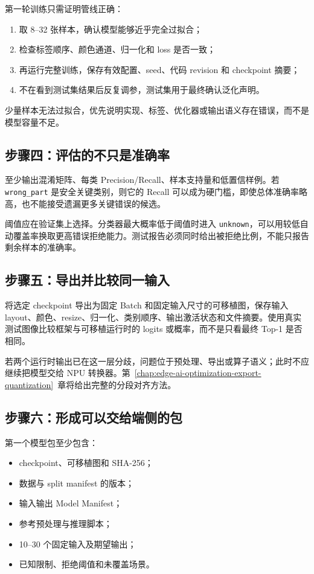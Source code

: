 第一轮训练只需证明管线正确：

\begin{enumerate}
  \item 取 8--32 张样本，确认模型能够近乎完全过拟合；
  \item 检查标签顺序、颜色通道、归一化和 loss 是否一致；
  \item 再运行完整训练，保存有效配置、seed、代码 revision 和 checkpoint 摘要；
  \item 不在看到测试集结果后反复调参，测试集用于最终确认泛化声明。
\end{enumerate}

少量样本无法过拟合，优先说明实现、标签、优化器或输出语义存在错误，而不是模型容量不足。

\subsection{步骤四：评估的不只是准确率}

至少输出混淆矩阵、每类 Precision/Recall、样本支持量和低置信样例。若 \texttt{wrong\_part} 是安全关键类别，则它的 Recall 可以成为硬门槛，即使总体准确率略高，也不能接受遗漏更多关键错误的候选。

阈值应在验证集上选择。分类器最大概率低于阈值时进入 \texttt{unknown}，可以用较低自动覆盖率换取更高错误拒绝能力。测试报告必须同时给出被拒绝比例，不能只报告剩余样本的准确率。

\subsection{步骤五：导出并比较同一输入}

将选定 checkpoint 导出为固定 Batch 和固定输入尺寸的可移植图，保存输入 layout、颜色、resize、归一化、类别顺序、输出激活状态和文件摘要。使用真实测试图像比较框架与可移植运行时的 logits 或概率，而不是只看最终 Top-1 是否相同。

若两个运行时输出已在这一层分歧，问题位于预处理、导出或算子语义；此时不应继续把模型交给 NPU 转换器。第~\ref{chap:edge-ai-optimization-export-quantization}~章将给出完整的分段对齐方法。

\subsection{步骤六：形成可以交给端侧的包}

第一个模型包至少包含：

\begin{itemize}
  \item checkpoint、可移植图和 SHA-256；
  \item 数据与 split manifest 的版本；
  \item 输入输出 Model Manifest；
  \item 参考预处理与推理脚本；
  \item 10--30 个固定输入及期望输出；
  \item 已知限制、拒绝阈值和未覆盖场景。
\end{itemize}

